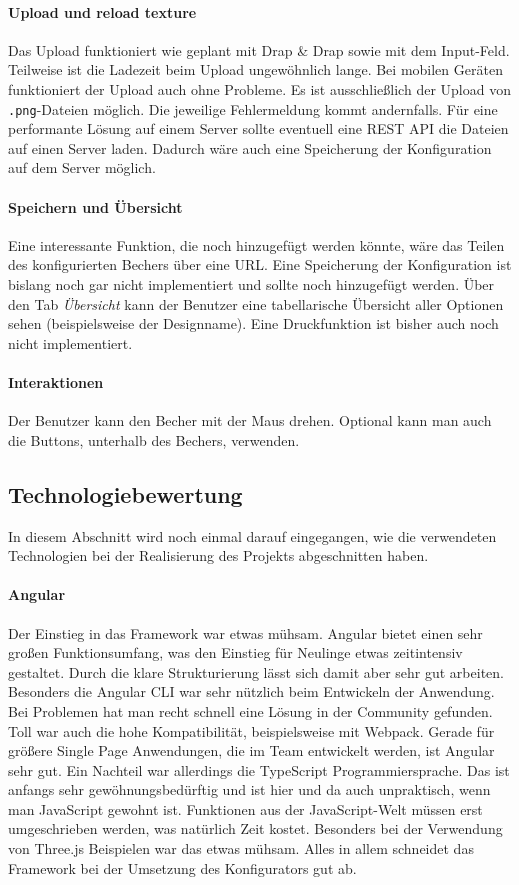 \paragraph{Upload und reload texture}
Das Upload funktioniert wie geplant mit Drap \& Drap sowie mit dem Input-Feld. Teilweise ist die Ladezeit beim Upload ungewöhnlich lange. Bei mobilen Geräten funktioniert der Upload auch ohne Probleme. Es ist ausschließlich der Upload von \texttt{.png}-Dateien möglich. Die jeweilige Fehlermeldung kommt andernfalls. Für eine performante Lösung auf einem Server sollte eventuell eine REST API die Dateien auf einen Server laden. Dadurch wäre auch eine Speicherung der Konfiguration auf dem Server möglich.
\paragraph{Speichern und Übersicht}
Eine interessante Funktion, die noch hinzugefügt werden könnte, wäre das Teilen des konfigurierten Bechers über eine URL. Eine Speicherung der Konfiguration ist bislang noch gar nicht implementiert und sollte noch hinzugefügt werden. Über den Tab \textit{Übersicht} kann der Benutzer eine tabellarische Übersicht aller Optionen sehen (beispielsweise der Designname). Eine Druckfunktion ist bisher auch noch nicht implementiert.
\paragraph{Interaktionen}
Der Benutzer kann den Becher mit der Maus drehen. Optional kann man auch die Buttons, unterhalb des Bechers, verwenden.

\subsection{Technologiebewertung}
In diesem Abschnitt wird noch einmal darauf eingegangen, wie die verwendeten Technologien bei der Realisierung des Projekts abgeschnitten haben.
\paragraph{Angular}
Der Einstieg in das Framework war etwas mühsam. Angular bietet einen sehr großen Funktionsumfang, was den Einstieg für Neulinge etwas zeitintensiv gestaltet. Durch die klare Strukturierung lässt sich damit aber sehr gut arbeiten. Besonders die Angular CLI war sehr nützlich beim Entwickeln der Anwendung. Bei Problemen hat man recht schnell eine Lösung in der Community gefunden. Toll war auch die hohe Kompatibilität, beispielsweise mit Webpack. Gerade für größere Single Page Anwendungen, die im Team entwickelt werden, ist Angular sehr gut. Ein Nachteil war allerdings die TypeScript Programmiersprache. Das ist anfangs sehr gewöhnungsbedürftig und ist hier und da auch unpraktisch, wenn man JavaScript gewohnt ist. Funktionen aus der JavaScript-Welt müssen erst umgeschrieben werden, was natürlich Zeit kostet. Besonders bei der Verwendung von Three.js Beispielen war das etwas mühsam. Alles in allem schneidet das Framework bei der Umsetzung des Konfigurators gut ab.
